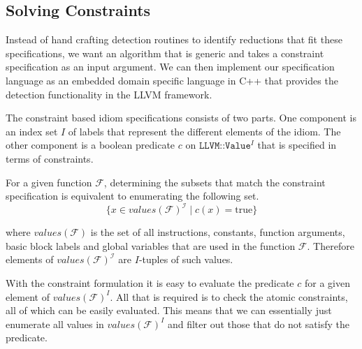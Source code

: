 
\subsection{Solving Constraints}
Instead of hand crafting detection routines to identify reductions 
 that fit these specifications, we want an algorithm
that is generic and takes a constraint specification as an input
argument.  We can then implement our specification language as an
embedded domain specific language in C++ that provides the detection
functionality in the LLVM framework. %

The constraint based idiom specifications 
consists of two parts.  One component is an index set
$I$ of labels that represent the different elements of the idiom.  The
other component is a boolean predicate $c$ on $\texttt{LLVM::Value}^I$
that is specified in terms of constraints.


For a given function $\mathcal F$,  determining the subsets that match the constraint specification
is  equivalent to enumerating the following set.
\begin{equation*}
\{x\in values(\mathcal F)^\mathcal I\mid c(x)=\text{true}\}
\end{equation*}

where $values(\mathcal F)$ is the set of all instructions,
constants, function arguments, basic block labels and global variables
that are used in the function $\mathcal F$.  Therefore elements of
$values(\mathcal F)^\mathcal I$ are $I$-tuples of such values.

With the constraint formulation it is easy to evaluate the predicate $c$ for a given element of $values(\mathcal F)^I$.
All that is required is to check the atomic constraints, all of which can be 
easily evaluated.
This means that we can essentially just enumerate all values in $values(\mathcal F)^I$ and filter out those that do not satisfy the predicate.

